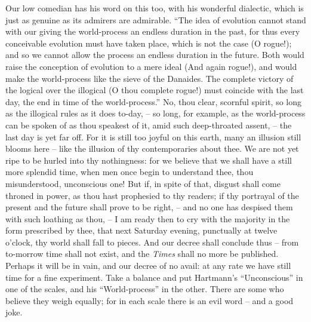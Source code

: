 Our low comedian has his word on this too, with his wonderful
dialectic, which is just as genuine as its admirers are admirable.
\enquote{The idea of evolution cannot stand with our giving the world-process
an endless duration in the past, for thus every conceivable evolution
must have taken place, which is not the case (O rogue!); and so we
cannot allow the process an endless duration in the future. Both
would raise the conception of evolution to a mere ideal (And again
rogue!), and would make the world-process like the sieve of the
Danaides. The complete victory of the logical over the illogical (O
thou complete rogue!) must coincide with the last day, the end in
time of the world-process.} No, thou clear, scornful spirit, so long
as the illogical rules as it does to-day, -- so long, for example, as
the world-process can be spoken of as thou speakest of it, amid such
deep-throated assent, -- the last day is yet far off. For it is still
too joyful on this earth, many an illusion still blooms here -- like
the illusion of thy contemporaries about thee. We are not yet ripe to
be hurled into thy nothingness: for we believe that we shall have a
still more splendid time, when men once begin to understand thee,
thou misunderstood, unconscious one! But if, in spite of that,
disgust shall come throned in power, as thou hast prophesied to thy
readers; if thy portrayal of the present and the future shall prove
to be right, -- and no one has despised them with such loathing as
thou, -- I am ready then to cry with the majority in the form
prescribed by thee, that next Saturday evening, punctually at twelve
o'clock, thy world shall fall to pieces. And our decree shall
conclude thus -- from to-morrow time shall not exist, and the \textit{Times}
shall no more be published. Perhaps it will be in vain, and our
decree of no avail: at any rate we have still time for a fine
experiment. Take a balance and put Hartmann's \enquote{Unconscious} in one of
the scales, and his \enquote{World-process} in the other. There are some who
believe they weigh equally; for in each scale there is an evil
word -- and a good joke.

